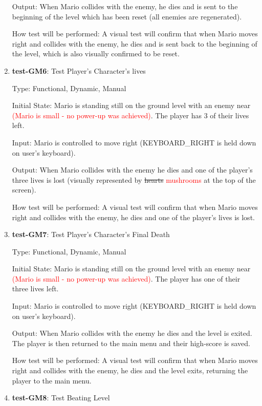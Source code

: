 \documentclass[12pt, titlepage]{article}
\begin{document}
\begin{enumerate}
Output: When Mario collides with the enemy, he dies and is sent to the beginning of the level which has been reset (all enemies are regenerated).

How test will be performed: A visual test will confirm that when Mario moves right and collides with the enemy, he dies and is sent back to the beginning of the level, which is also visually confirmed to be reset.

\item{\textbf{test-GM6}: Test Player's Character's lives\\}

Type: Functional, Dynamic, Manual

Initial State: Mario is standing still on the ground level with an enemy near \textcolor{red}{(Mario is small - no power-up was achieved)}. The player has 3 of their lives left.

Input: Mario is controlled to move right (KEYBOARD\_RIGHT is held down on user's keyboard).

Output: When Mario collides with the enemy he dies and one of the player's three lives is lost (visually represented by \sout{hearts} \textcolor{red}{mushrooms} at the top of the screen).

How test will be performed: A visual test will confirm that when Mario moves right and collides with the enemy, he dies and one of the player's lives is lost.

\item{\textbf{test-GM7}: Test Player's Character's Final Death\\}

Type: Functional, Dynamic, Manual

Initial State: Mario is standing still on the ground level with an enemy near \textcolor{red}{(Mario is small - no power-up was achieved)}. The player has one of their three lives left.

Input: Mario is controlled to move right (KEYBOARD\_RIGHT is held down on user's keyboard).

Output: When Mario collides with the enemy he dies and the level is exited. The player is then returned to the main menu and their high-score is saved.

How test will be performed: A visual test will confirm that when Mario moves right and collides with the enemy, he dies and the level exits, returning the player to the main menu.

\item{\textbf{test-GM8}: Test Beating Level\\}


\end{enumerate}
\end{document}
